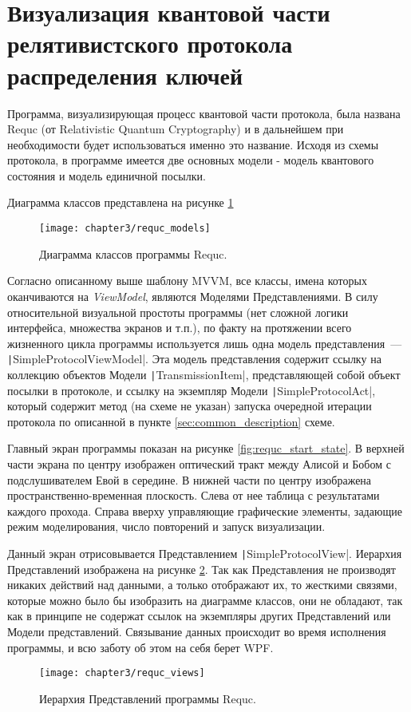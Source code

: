 \section{Визуализация квантовой части релятивистского протокола распределения ключей}
Программа, визуализирующая процесс квантовой части протокола, была названа Requc (от Relativistic Quantum Cryptography) и в дальнейшем при необходимости будет использоваться именно это название.
Исходя из схемы протокола, в программе имеется две основных модели - модель квантового состояния и модель единичной посылки. 

Диаграмма классов представлена на рисунке \ref{fig:requc_models}
\begin{figure}[h]
  \texttt{[image: chapter3/requc\_models]}
  \caption{Диаграмма классов программы Requc.}
  \label{fig:requc_models}
\end{figure}

Согласно описанному выше шаблону MVVM, все классы, имена которых оканчиваются на \textit{ViewModel}, являются Моделями Представлениями. 
В силу относительной визуальной простоты программы (нет сложной логики интерфейса, множества экранов и т.п.), по факту на протяжении всего жизненного цикла программы используется лишь одна модель представления~--- \texttt|SimpleProtocolViewModel|. Эта модель представления содержит ссылку на коллекцию объектов Модели \texttt|TransmissionItem|, представляющей собой объект посылки в протоколе, и ссылку на экземпляр Модели \texttt|SimpleProtocolAct|, который содержит метод (на схеме не указан) запуска очередной итерации протокола по описанной в пункте \ref{sec:common_description} схеме.

Главный экран программы показан на рисунке \ref{fig:requc_start_state}. В верхней части экрана по центру изображен оптический тракт между Алисой и Бобом с подслушивателем Евой в середине. В нижней части по центру изображена пространственно-временная плоскость. Слева от нее таблица с результатами каждого прохода. Справа вверху управляющие графические элементы, задающие режим моделирования, число повторений и запуск визуализации.

Данный экран отрисовывается Представлением \texttt|SimpleProtocolView|. Иерархия Представлений изображена на рисунке \ref{fig:requc_views}. Так как Представления не производят никаких действий над данными, а только отображают их, то жесткими связями, которые можно было бы изобразить на диаграмме классов, они не обладают, так как в принципе не содержат ссылок на экземпляры других Представлений или Модели представлений. Связывание данных происходит во время исполнения программы, и всю заботу об этом на себя берет WPF.
\begin{figure}[h]
  \texttt{[image: chapter3/requc\_views]}
  \caption{Иерархия Представлений программы Requc.}
  \label{fig:requc_views}
\end{figure}

